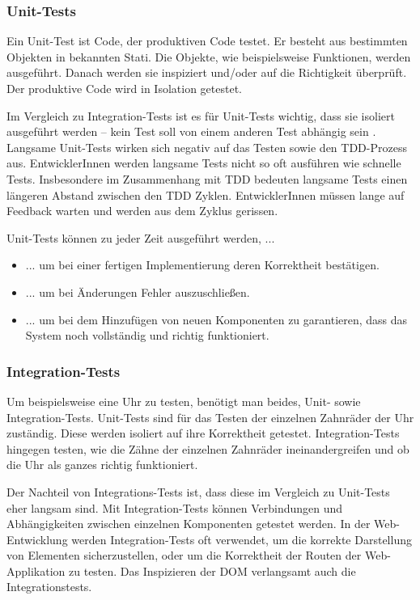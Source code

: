 \subsubsection{Unit-Tests}
Ein Unit-Test ist Code, der produktiven Code testet. Er besteht aus bestimmten Objekten in bekannten Stati. Die Objekte, wie beispielsweise Funktionen, werden ausgeführt. Danach werden sie inspiziert und/oder auf die Richtigkeit überprüft. Der produktive Code wird in Isolation getestet.

Im Vergleich zu Integration-Tests ist es für Unit-Tests wichtig, dass sie isoliert ausgeführt werden -- kein Test soll von einem anderen Test abhängig sein \autocite[4]{Johansen:2011}. Langsame Unit-Tests wirken sich negativ auf das Testen sowie den TDD-Prozess aus. EntwicklerInnen werden langsame Tests nicht so oft ausführen wie schnelle Tests. Insbesondere im Zusammenhang mit TDD bedeuten langsame Tests einen längeren Abstand zwischen den TDD Zyklen. EntwicklerInnen müssen lange auf Feedback warten und werden aus dem Zyklus gerissen.

Unit-Tests können zu jeder Zeit ausgeführt werden, ...
\begin{itemize}
  \item ... um bei einer fertigen Implementierung deren Korrektheit bestätigen.
  \item ... um bei Änderungen Fehler auszuschließen.
  \item ... um bei dem Hinzufügen von neuen Komponenten zu garantieren, dass das System noch vollständig und richtig funktioniert.
\end{itemize}


\subsubsection{Integration-Tests}
Um beispielsweise eine Uhr zu testen, benötigt man beides, Unit- sowie Integration-Tests. Unit-Tests sind für das Testen der einzelnen Zahnräder der Uhr zuständig. Diese werden isoliert auf ihre Korrektheit getestet. Integration-Tests hingegen testen, wie die Zähne der einzelnen Zahnräder ineinandergreifen und ob die Uhr als ganzes richtig funktioniert.

Der Nachteil von Integrations-Tests ist, dass diese im Vergleich zu Unit-Tests eher langsam sind. Mit Integration-Tests können Verbindungen und Abhängigkeiten zwischen einzelnen Komponenten getestet werden. In der Web-Entwicklung werden Integration-Tests oft verwendet, um die korrekte Darstellung von Elementen sicherzustellen, oder um die Korrektheit der Routen der Web-Applikation zu testen. 
Das Inspizieren der DOM verlangsamt auch die Integrationstests.

